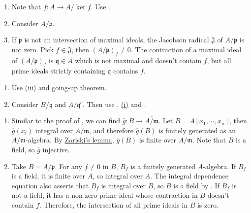 \begin{exercise}\label{ex5.23}
	\begin{enumerate}
		\item[(i) $\Rightarrow$ (ii)] Note that $f:A\rightarrow A/\ker f$. Use .
		\item[(ii) $\Rightarrow$ (iii)] Consider $A/\mathfrak{p}$.
		\item[(iii) $\Rightarrow$ (i)] If $\mathfrak{p}$ is not an intersection of maximal ideals, the Jacobson radical $\mathfrak{J}$ of $A/\mathfrak{p}$ is not zero. Pick $f\in\mathfrak{J}$, then $(A/\mathfrak{p})_f\neq0$. The contraction of a maximal ideal of $(A/\mathfrak{p})_f$ is $\mathfrak{q}\in A$ which is not maximal and doesn't contain $f$, but all prime ideals strictly containing $\mathfrak{q}$ contains $f$.
	\end{enumerate}
\end{exercise}

\begin{exercise}\label{ex5.24}
	\begin{enumerate}[label=(\roman*),ref=\theexercise(\roman*)]
		\item Use \hyperref[ex5.23]{(iii)} and \hyperref[5.11]{going-up theorem}.
		\item Consider $B/\mathfrak{q}$ and $A/\mathfrak{q}^c$. Then use , \hyperref[ex5.23]{(i)} and .
	\end{enumerate}
\end{exercise}

\begin{exercise}\label{ex5.25}
	\begin{enumerate}
		\item[(i) $\Rightarrow$ (ii)] Similar to the proof of , we can find $\overline{g}:B\rightarrow\overline{A/\mathfrak{m}}$. Let $B=A\left[x_1,\cdots,x_n\right]$, then $\overline{g}\left(x_i\right)$ integral over $A/\mathfrak{m}$, and therefore $\overline{g}(B)$ is finitely generated as an $A/\mathfrak{m}$-algebra. By \hyperref[ex5.18]{Zariski's lemma}, $\overline{g}(B)$ is finite over $A/\mathfrak{m}$. Note that $B$ is a field, so $\overline{g}$ injective.
		\item[(ii) $\Rightarrow$ (i)] Take $B=A/\mathfrak{p}$. For any $f\neq0$ in $B$, $B_f$ is a finitely generated $A$-algebra. If $B_f$ is a field, it is finite over $A$, so integral over $A$. The integral dependence equation also asserts that $B_f$ is integral over $B$, so $B$ is a field by . If $B_f$ is not a field, it has a non-zero prime ideal whose contraction in $B$ doesn't contain $f$. Therefore, the intersection of all prime ideals in $B$ is zero.
	\end{enumerate}
\end{exercise}

